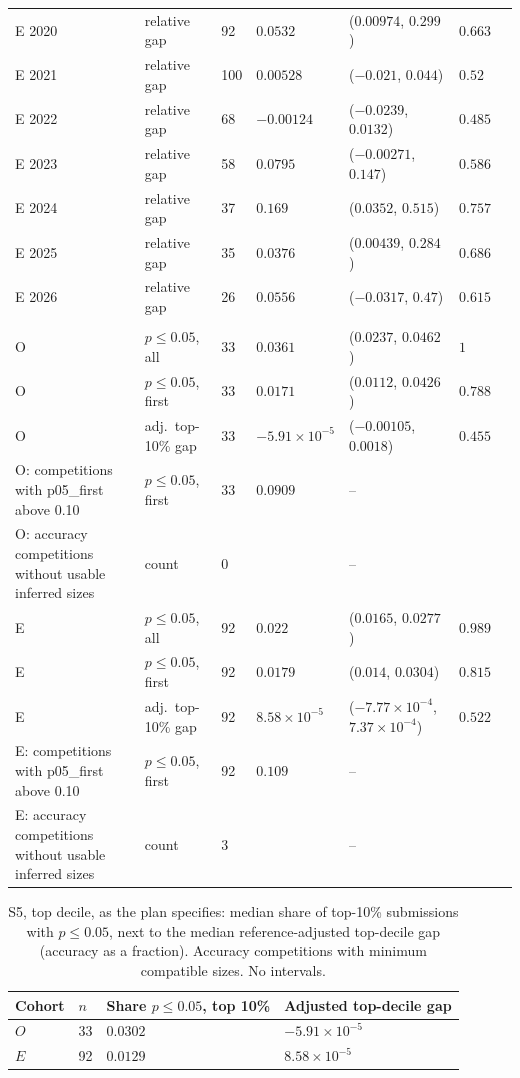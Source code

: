{\begin{longtable}{>{\raggedright\arraybackslash}p{4.1cm}>{\raggedright\arraybackslash}p{1.9cm}p{1.1cm}p{1.9cm}p{3.5cm}p{0.9cm}p{1.6cm}}
E 2020 & relative gap & 92 & $0.0532$ & ($0.00974$, $0.299$) & $0.663$ &  \\
E 2021 & relative gap & 100 & $0.00528$ & ($-0.021$, $0.044$) & $0.52$ &  \\
E 2022 & relative gap & 68 & $-0.00124$ & ($-0.0239$, $0.0132$) & $0.485$ &  \\
E 2023 & relative gap & 58 & $0.0795$ & ($-0.00271$, $0.147$) & $0.586$ &  \\
E 2024 & relative gap & 37 & $0.169$ & ($0.0352$, $0.515$) & $0.757$ &  \\
E 2025 & relative gap & 35 & $0.0376$ & ($0.00439$, $0.284$) & $0.686$ &  \\
E 2026 & relative gap & 26 & $0.0556$ & ($-0.0317$, $0.47$) & $0.615$ &  \\
\midrule
\multicolumn{7}{l}{\textbf{S5}} \\
O & $p\le0.05$, all & 33 & $0.0361$ & ($0.0237$, $0.0462$) & $1$ &  \\
O & $p\le0.05$, first & 33 & $0.0171$ & ($0.0112$, $0.0426$) & $0.788$ &  \\
O & adj.\ top-10\% gap & 33 & $-5.91\times10^{-5}$ & ($-0.00105$, $0.0018$) & $0.455$ &  \\
O: competitions with p05\_first above 0.10 & $p\le0.05$, first & 33 & $0.0909$ & -- &  &  \\
O: accuracy competitions without usable inferred sizes & count & 0 &  & -- &  &  \\
E & $p\le0.05$, all & 92 & $0.022$ & ($0.0165$, $0.0277$) & $0.989$ &  \\
E & $p\le0.05$, first & 92 & $0.0179$ & ($0.014$, $0.0304$) & $0.815$ &  \\
E & adj.\ top-10\% gap & 92 & $8.58\times10^{-5}$ & ($-7.77\times10^{-4}$, $7.37\times10^{-4}$) & $0.522$ &  \\
E: competitions with p05\_first above 0.10 & $p\le0.05$, first & 92 & $0.109$ & -- &  &  \\
E: accuracy competitions without usable inferred sizes & count & 3 &  & -- &  &  \\
\bottomrule
\end{longtable}}

\begin{table}[!t]
\centering\small
\caption{S5, top decile, as the plan specifies: median share of top-10\% submissions with $p\le0.05$, next to the median reference-adjusted top-decile gap (accuracy as a fraction). Accuracy competitions with minimum compatible sizes. No intervals.}\label{tab:s5}
\begin{tabular}{llll}
\toprule
Cohort & $n$ & Share $p\le0.05$, top 10\% & Adjusted top-decile gap \\
\midrule
$O$ & 33 & $0.0302$ & $-5.91\times10^{-5}$ \\
$E$ & 92 & $0.0129$ & $8.58\times10^{-5}$ \\
\bottomrule
\end{tabular}
\end{table}

